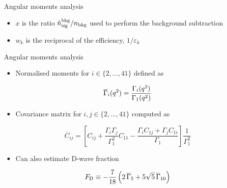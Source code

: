 \documentclass[aspectratio=1610]{beamer}
\begin{document}
\begin{frame}{Angular moments analysis}
\bigskip

\begin{itemize}
\item $x$ is the ratio $\tilde{n}^{\rm bkg}_{\rm sig}/n_{\rm bkg}$ used to perform the background subtraction
\item $w_{k}$ is the reciprocal of the efficiency, $1/\varepsilon_{k}$
\end{itemize}

\end{frame}

\begin{frame}{Angular moments analysis}

\begin{itemize}
\item Normalised moments for $i \in \{2,...,41\}$ defined as
\end{itemize}
\begin{equation*}
\overline{\Gamma}_i({q^2}) = \frac{\Gamma_{i}({q^2})}{\Gamma_{1}({q^2})}
\end{equation*}
\begin{itemize}
\item Covariance matrix for $i,j \in \{2,...,41\}$ computed as
\end{itemize}

\begin{equation*}
\overline{C}_{ij} = \left[C_{ij} + \frac{\Gamma_i \Gamma_j}{\Gamma_1^2} C_{11} - \frac{\Gamma_i C_{1j} + \Gamma_j C_{1i}}{\Gamma_1}\right] \frac{1}{\Gamma_1^2}
\end{equation*}

\begin{itemize}
\item[\ding{80}] Can also estimate D-wave fraction
\end{itemize}

\begin{equation*}
F_{\rm D} \equiv  \displaystyle - \frac{7}{18} \left(2\,\overline{\Gamma}_{5} + 5 \sqrt{5}\,\overline{\Gamma}_{10} \right)
\end{equation*}

\end{frame}
\end{document}
